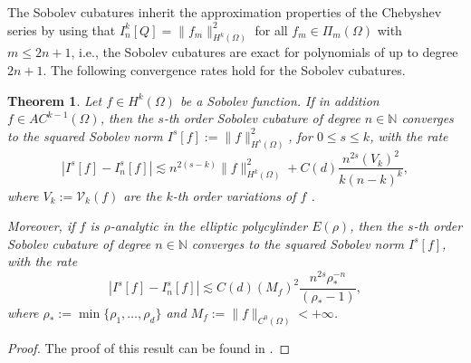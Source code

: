 \documentclass[pdflatex]{sn-jnl}%
\newtheorem{theorem}{Theorem}[section]%
\begin{document}
The Sobolev cubatures inherit the approximation properties of the Chebyshev series by using that $I_n^k[Q] = \|f_m\|_{H^k(\Omega)}^2$ for all $f_m\in \Pi_{m}(\Omega)$ with $m\leq 2n+1$, i.e., the Sobolev cubatures are exact for polynomials of up to degree $2n+1$. The following convergence rates hold for the Sobolev cubatures.
\begin{theorem}\cite{Suarez2025}\label{thm:sob_cub_s}
        Let $f\in H^k(\Omega)$ be a Sobolev function. If in addition $f\in AC^{k-1}(\Omega)$, then the $s$-th order Sobolev cubature of degree $n\in \mathbb{N}$ converges to the squared Sobolev norm $I^s[f]:=\|f\|_{H^s(\Omega)}^2$, for $0\leq s\leq k$, with the rate
    \begin{equation}
        |I^s[f]-I^s_n[f]|\lesssim n^{2(s-k)}\|f\|_{H^{k}(\Omega)}^2+C(d)\frac{ n^{2s}(V_{k})^2}{ k (n-k)^k},
    \end{equation}
     where $V_{k}:=\mathcal{V}_k(f)$ are the $k$-th order variations of $f$ \cite{Cardona2024-sr}.

     Moreover, if $f$ is $\rho$-analytic in the elliptic polycylinder $E(\rho)$, then the $s$-th order Sobolev cubature of degree $n\in \mathbb{N}$ converges to the squared Sobolev norm $I^s[f]$, with the rate
    \begin{equation}
        |I^s[f]-I^s_n[f]|\lesssim C(d)(M_{f})^2\frac{n^{2s}\rho_*^{-n}}{(\rho_*-1)},
    \end{equation}
    where $\rho_*:=\min\limits \{\rho_1,\dots,\rho_{d}\}$ and $M_f:=\|f\|_{C^0(\Omega)}<+\infty$.
\end{theorem}
\vspace{-1em}\begin{proof}
    The proof of this result can be found in \cite{Cardona2024-sr}.
\end{proof}
\end{document}
